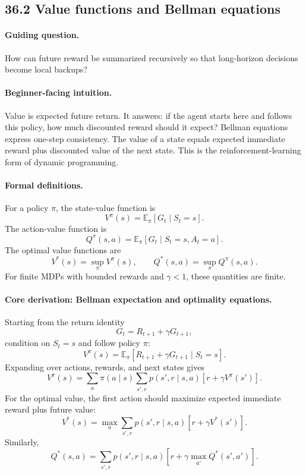 \subsection{36.2 Value functions and Bellman equations}

\paragraph{Guiding question.}
How can future reward be summarized recursively so that long-horizon decisions become local backups?

\paragraph{Beginner-facing intuition.}
Value is expected future return. It answers: if the agent starts here and follows this policy, how much discounted reward should it expect? Bellman equations express one-step consistency. The value of a state equals expected immediate reward plus discounted value of the next state. This is the reinforcement-learning form of dynamic programming.

\paragraph{Formal definitions.}
For a policy \(\pi\), the state-value function is
\[
\boxed{
V^\pi(s)=\mathbb E_\pi[G_t\mid S_t=s].
}
\]
The action-value function is
\[
\boxed{
Q^\pi(s,a)=\mathbb E_\pi[G_t\mid S_t=s,A_t=a].
}
\]
The optimal value functions are
\[
V^*(s)=\sup_\pi V^\pi(s),\qquad Q^*(s,a)=\sup_\pi Q^\pi(s,a).
\]
For finite MDPs with bounded rewards and \(\gamma<1\), these quantities are finite.

\paragraph{Core derivation: Bellman expectation and optimality equations.}
Starting from the return identity
\[
G_t=R_{t+1}+\gamma G_{t+1},
\]
condition on \(S_t=s\) and follow policy \(\pi\):
\[
V^\pi(s)
=\mathbb E_\pi[R_{t+1}+\gamma G_{t+1}\mid S_t=s].
\]
Expanding over actions, rewards, and next states gives
\[
\boxed{
V^\pi(s)=
\sum_a\pi(a\mid s)\sum_{s',r}p(s',r\mid s,a)
\left[r+\gamma V^\pi(s')\right].
}
\]
For the optimal value, the first action should maximize expected immediate reward plus future value:
\[
\boxed{
V^*(s)=
\max_a\sum_{s',r}p(s',r\mid s,a)
\left[r+\gamma V^*(s')\right].
}
\]
Similarly,
\[
\boxed{
Q^*(s,a)=
\sum_{s',r}p(s',r\mid s,a)
\left[r+\gamma\max_{a'}Q^*(s',a')\right].
}
\]


